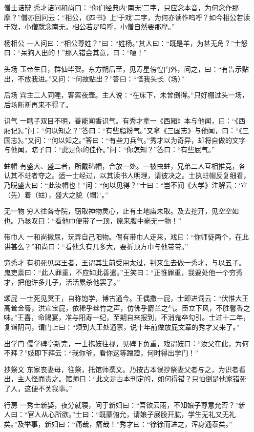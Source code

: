 \documentclass[12pt,UTF8]{ctexbook}
\begin{document}
僧士诘辩
秀才诘问和尚曰：“你们经典内‘南无’二字，只应念本音，为何念作那摩？”僧亦回问云：“相公，《四书》上‘于戏’二字，为何亦读作呜呼？如今相公若读于戏，小僧就念南无。相公若是呜呼，小僧自然要那摩。”

杨相公
一人问曰：“相公尊姓？”曰：“姓杨。”其人曰：“既是羊，为甚无角？”士怒曰：“呆狗入出的！”那人错会其意，曰：“嗄！”

头场
玉帝生日，群仙毕贺。东方朔后至，见寿星傍惶门外，问之，曰：“有告示贴出，不放我进。”又问：“何故贴出？”答曰：“怪我头长（场）”

后场
宾主二人同睡，客索夜壶。主人说：“在床下，未曾倒得。”只好棚过头一场，后场断断再来不得了。

识气
一瞎子双目不明，善能闻香识气。有秀才拿一《西厢》本与他闻，曰：“《西厢记》。”问：“何以知之？”答曰：“有些脂粉气。”又拿《三国志》与他闻，曰：“《三国志》。”又问：“何以知之。”答曰：“有些刀兵气。”秀才以为奇异，却将自做的文字与他闻，瞎子曰：“此是你的佳作。”问：“你怎知？”答曰：“有些屁气。”

蛀帽
有盛大、盛二者，所戴毡帽，合放一处。一被虫蛀，兄弟二人互相推竞，各认其不蛀者夺之。适一士经过，以其读书人明理，请彼决之。士执蛀帽反复细看，乃睨盛大曰：“此汝帽也！”问：“何以见得？”士曰：“岂不闻《大学》注解云：‘宣（先）着（蛀），盛大之貌（帽）’。”

无一物
穷人往各寺院，窃取神物灵心，止有土地庙未取。及去挖开，见空空如也。乃骇叹曰：“看他巾便带了一顶，原来腹中毫无一物！”

带巾人
一和尚撒尿，玩弄自己阳物。偶有带巾人走来，戏曰：“你师徒两个，在此讲甚么？”和尚曰：“看他头有几多大，要折顶方巾与他带带。”

穷秀才
有初死见冥王者，王谓其生前受用太过，判来生去做一秀才，与以五子。鬼吏禀曰：“此人罪重，不应如此善遣。”王笑曰：“正惟罪重，我要处他一个穷秀才，把他许多儿子，活活累杀他罢了。”

颂屁
一士死见冥王，自称饱学，博古通今。王偶撒一屁，士即进词云：“伏惟大王高耸金臀，洪宣宝屁，依稀乎丝竹之声，仿佛乎麝兰之气。臣立下风，不胜馨香之味。”王喜，命赐宴，准与阳寿一纪，至期自来报到，不消鬼卒勾引。士过十二年，复诣阴司，谓门上曰：“烦到大王处通禀，说十年前做放屁文章的秀才又来了。”

出学门
儒学碑亭新完，一士携妓往视，见碑下负重，戏谓妓曰：“汝父在此，为何不拜？”妓即下拜云：“我你爷，看你这等蹭蹬，何时得出学门！”

抄祭文
东家丧妻母，往祭，托馆师撰文。乃按古本误抄祭妻父者与之，为识者看出，主人怪而责之。馆师曰：“此文是古本刊定的，如何得错？只怕倒是他家错死了人，这便不关我事。”

行房
一秀士新娶，夜分就寝，问于新妇曰：“吾欲云雨，不知娘子尊意允否？”新人曰：“官人从心所欲。”士曰：“既蒙俯允，请娘子展股开肱，学生无礼又无礼矣。”及举事，新妇曰：“痛哉，痛哉！”秀才曰：“徐徐而进之，浑身通泰矣。”
\end{document}
